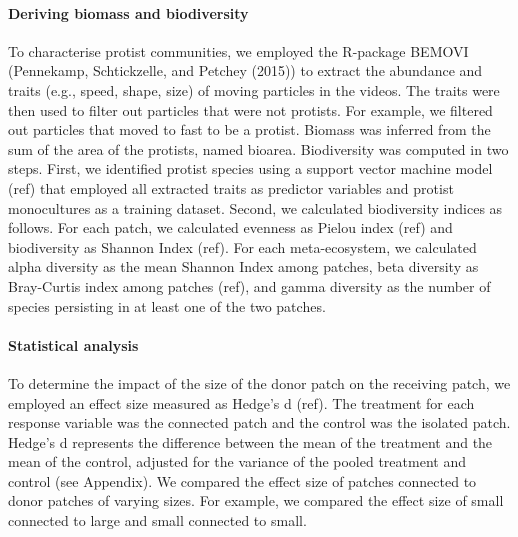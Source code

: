 \documentclass[
]{article}
\begin{document}
\hypertarget{deriving-biomass-and-biodiversity}{%
\paragraph{Deriving biomass and
biodiversity}\label{deriving-biomass-and-biodiversity}}

To characterise protist communities, we employed the R-package BEMOVI
(Pennekamp, Schtickzelle, and Petchey (2015)) to extract the abundance
and traits (e.g., speed, shape, size) of moving particles in the videos.
The traits were then used to filter out particles that were not
protists. For example, we filtered out particles that moved to fast to
be a protist. Biomass was inferred from the sum of the area of the
protists, named bioarea. Biodiversity was computed in two steps. First,
we identified protist species using a support vector machine model (ref)
that employed all extracted traits as predictor variables and protist
monocultures as a training dataset. Second, we calculated biodiversity
indices as follows. For each patch, we calculated evenness as Pielou
index (ref) and biodiversity as Shannon Index (ref). For each
meta-ecosystem, we calculated alpha diversity as the mean Shannon Index
among patches, beta diversity as Bray-Curtis index among patches (ref),
and gamma diversity as the number of species persisting in at least one
of the two patches.

\hypertarget{statistical-analysis}{%
\paragraph{Statistical analysis}\label{statistical-analysis}}

To determine the impact of the size of the donor patch on the receiving
patch, we employed an effect size measured as Hedge's d (ref). The
treatment for each response variable was the connected patch and the
control was the isolated patch. Hedge's d represents the difference
between the mean of the treatment and the mean of the control, adjusted
for the variance of the pooled treatment and control (see Appendix). We
compared the effect size of patches connected to donor patches of
varying sizes. For example, we compared the effect size of small
connected to large and small connected to small.
\end{document}
